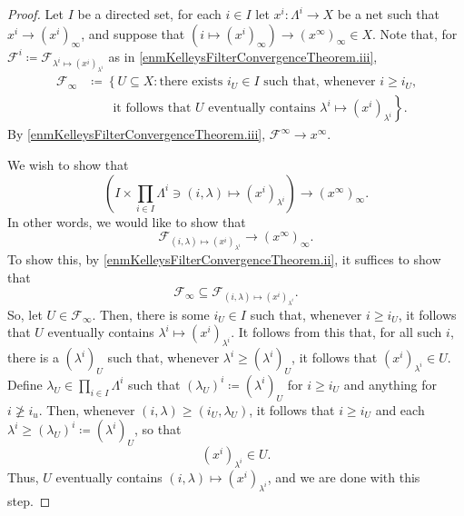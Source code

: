 \begin{thm}
\begin{proof}
Let $I$ be a directed set, for each $i\in I$ let $x^i:\Lambda ^i\rightarrow X$ be a net such that $x^i\to (x^i)_\infty$, and suppose that $(i\mapsto (x^i)_\infty )\to (x^\infty )_\infty \in X$.  Note that, for $\mathcal{F}^i\coloneqq \mathcal{F}_{\lambda ^i\mapsto (x^i)_{\lambda ^i}}$ as in \ref{enmKelleysFilterConvergenceTheorem.iii},
\begin{equation}
\begin{split}
\mathcal{F}_\infty & \coloneqq \left\{ U\subseteq X:\text{there exists }i_U\in I\text{ such that, whenever }i\geq i_U\text{,}\right. \\
& \qquad \left. \text{it follows that }U\text{ eventually contains }\lambda ^i\mapsto (x^i)_{\lambda ^i}\right\} .
\end{split}
\end{equation}
By \ref{enmKelleysFilterConvergenceTheorem.iii}, $\mathcal{F}^\infty \to x^\infty$.

We wish to show that
\begin{equation}
\left( I\times \prod _{i\in I}\Lambda ^i\ni (i,\lambda )\mapsto (x^i)_{\lambda ^i}\right) \to (x^\infty )_\infty .
\end{equation}
In other words, we would like to show that
\begin{equation}
\mathcal{F}_{(i,\lambda )\mapsto (x^i)_{\lambda ^i}}\to (x^\infty )_\infty .
\end{equation}
To show this, by \ref{enmKelleysFilterConvergenceTheorem.ii}, it suffices to show that
\begin{equation}
\mathcal{F}_\infty \subseteq \mathcal{F}_{(i,\lambda )\mapsto (x^i)_{\lambda ^i}}.
\end{equation}
So, let $U\in \mathcal{F}_\infty$.  Then, there is some $i_U\in I$ such that, whenever $i\geq i_U$, it follows that $U$ eventually contains $\lambda ^i\mapsto (x^i)_{\lambda ^i}$.  It follows from this that, for all such $i$, there is a $(\lambda ^i)_U$ such that, whenever $\lambda ^i\geq (\lambda ^i)_U$, it follows that $(x^i)_{\lambda ^i}\in U$.  Define $\lambda _U\in \prod _{i\in I}\Lambda ^i$ such that $(\lambda _U)^i\coloneqq (\lambda ^i)_U$ for $i\geq i_U$ and anything for $i\not \geq i_u$.  Then, whenever $(i,\lambda )\geq (i_U,\lambda _U)$, it follows that $i\geq i_U$ and each $\lambda ^i\geq (\lambda _U)^i\coloneqq (\lambda ^i)_U$, so that
\begin{equation}
(x^i)_{\lambda ^i}\in U.
\end{equation}
Thus, $U$ eventually contains $(i,\lambda )\mapsto (x^i)_{\lambda ^i}$, and we are done with this step.


\end{proof}
\end{thm}
